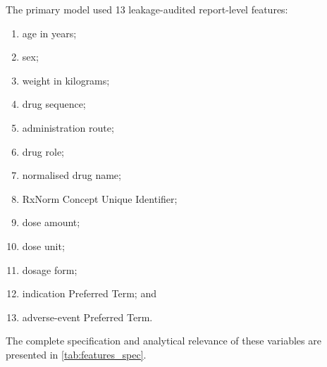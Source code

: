 \documentclass[10pt]{article}
\begin{document}
The primary model used 13 leakage-audited report-level features:
\begin{enumerate}
\item age in years;
\item sex;
\item weight in kilograms;
\item drug sequence;
\item administration route;
\item drug role;
\item normalised drug name;
\item RxNorm Concept Unique Identifier;
\item dose amount;
\item dose unit;
\item dosage form;
\item indication Preferred Term; and
\item adverse-event Preferred Term.
\end{enumerate}

The complete specification and analytical relevance of these variables are presented in \cref{tab:features_spec}.
\end{document}
